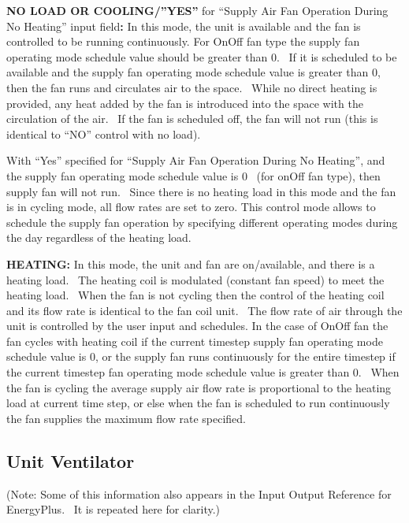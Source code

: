 \textbf{NO LOAD OR COOLING/''YES''} for ``Supply Air Fan Operation During No Heating'' input field\textbf{:} In this mode, the unit is available and the fan is controlled to be running continuously. For OnOff fan type the supply fan operating mode schedule value should be greater than 0.~ If it is scheduled to be available and the supply fan operating mode schedule value is greater than 0, then the fan runs and circulates air to the space.~ While no direct heating is provided, any heat added by the fan is introduced into the space with the circulation of the air.~ If the fan is scheduled off, the fan will not run (this is identical to ``NO'' control with no load).

With ``Yes'' specified for ``Supply Air Fan Operation During No Heating'', and the supply fan operating mode schedule value is 0~ (for onOff fan type), then supply fan will not run.~ Since there is no heating load in this mode and the fan is in cycling mode, all flow rates are set to zero. This control mode allows to schedule the supply fan operation by specifying different operating modes during the day regardless of the heating load.

\textbf{HEATING:} In this mode, the unit and fan are on/available, and there is a heating load.~ The heating coil is modulated (constant fan speed) to meet the heating load.~ When the fan is not cycling then the control of the heating coil and its flow rate is identical to the fan coil unit.~ The flow rate of air through the unit is controlled by the user input and schedules. In the case of OnOff fan the fan cycles with heating coil if the current timestep supply fan operating mode schedule value is 0, or the supply fan runs continuously for the entire timestep if the current timestep fan operating mode schedule value is greater than 0.~ When the fan is cycling the average supply air flow rate is proportional to the heating load at current time step, or else when the fan is scheduled to run continuously the fan supplies the maximum flow rate specified.

\subsection{Unit Ventilator}\label{unit-ventilator}

(Note: Some of this information also appears in the Input Output Reference for EnergyPlus.~ It is repeated here for clarity.)

